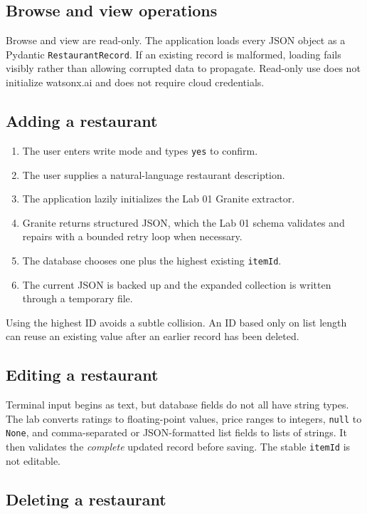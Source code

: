 \documentclass[11pt]{article}
\begin{document}
\subsection{Browse and view operations}

Browse and view are read-only. The application loads every JSON object as a
Pydantic \texttt{RestaurantRecord}. If an existing record is malformed, loading
fails visibly rather than allowing corrupted data to propagate. Read-only use
does not initialize watsonx.ai and does not require cloud credentials.

\subsection{Adding a restaurant}

\begin{enumerate}
  \item The user enters write mode and types \texttt{yes} to confirm.
  \item The user supplies a natural-language restaurant description.
  \item The application lazily initializes the Lab 01 Granite extractor.
  \item Granite returns structured JSON, which the Lab 01 schema validates and
        repairs with a bounded retry loop when necessary.
  \item The database chooses one plus the highest existing \texttt{itemId}.
  \item The current JSON is backed up and the expanded collection is written
        through a temporary file.
\end{enumerate}

Using the highest ID avoids a subtle collision. An ID based only on list length
can reuse an existing value after an earlier record has been deleted.

\subsection{Editing a restaurant}

Terminal input begins as text, but database fields do not all have string types.
The lab converts ratings to floating-point values, price ranges to integers,
\texttt{null} to \texttt{None}, and comma-separated or JSON-formatted list
fields to lists of strings. It then validates the \emph{complete} updated record
before saving. The stable \texttt{itemId} is not editable.

\subsection{Deleting a restaurant}
\end{document}
